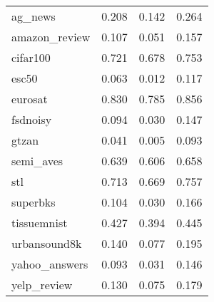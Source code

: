 \begin{table}[!h]
\begin{tabular}[t]{lrrr}
\hspace{1em}ag\_news & 0.208 & 0.142 & 0.264\\
\hspace{1em}amazon\_review & 0.107 & 0.051 & 0.157\\
\hspace{1em}cifar100 & 0.721 & 0.678 & 0.753\\
\hspace{1em}esc50 & 0.063 & 0.012 & 0.117\\
\hspace{1em}eurosat & 0.830 & 0.785 & 0.856\\
\hspace{1em}fsdnoisy & 0.094 & 0.030 & 0.147\\
\hspace{1em}gtzan & 0.041 & 0.005 & 0.093\\
\hspace{1em}semi\_aves & 0.639 & 0.606 & 0.658\\
\hspace{1em}stl & 0.713 & 0.669 & 0.757\\
\hspace{1em}superbks & 0.104 & 0.030 & 0.166\\
\hspace{1em}tissuemnist & 0.427 & 0.394 & 0.445\\
\hspace{1em}urbansound8k & 0.140 & 0.077 & 0.195\\
\hspace{1em}yahoo\_answers & 0.093 & 0.031 & 0.146\\
\hspace{1em}yelp\_review & 0.130 & 0.075 & 0.179\\
\bottomrule
\end{tabular}
\end{table}

